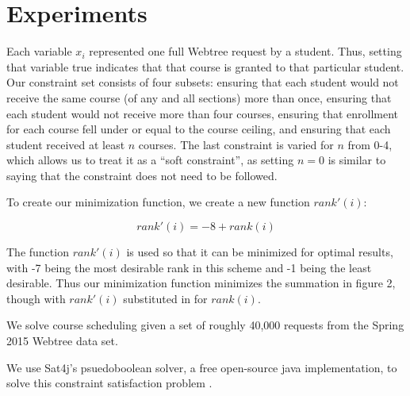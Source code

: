 
\section{Experiments}
\label{sec:expts}

Each variable $x_i$ represented one full Webtree request by a
student. Thus, setting that variable true indicates that that course
is granted to that particular student. Our constraint set consists of
four subsets: ensuring that each student would not receive the same
course (of any and all sections) more than once, ensuring that each
student would not receive more than four courses, ensuring that
enrollment for each course fell under or equal to the course ceiling,
and ensuring that each student received at least $n$ courses. The
last constraint is varied for $n$ from {0-4}, which allows us to treat it as
a ``soft constraint'', as setting $n=0$ is similar to saying that
the constraint does not need to be followed. 

To create our minimization function, we create a new function $rank'(i)$:

\begin{equation} rank'(i) = -8 + rank(i) \end{equation}

The function $rank'(i)$ is used so that it can be minimized for optimal
results, with -7 being the most desirable rank in this scheme and -1 being
the least desirable. Thus our minimization function minimizes the summation
in figure 2, though with $rank'(i)$ substituted in for $rank(i)$.

We solve course scheduling given a set of roughly 40,000 requests
from the Spring 2015 Webtree data set.

We use Sat4j's psuedoboolean solver, a free open-source java implementation, to solve this constraint
satisfaction problem \cite{sat4j}.
